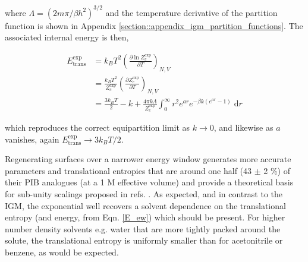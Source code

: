 \documentclass[../main.tex]{subfiles}
\begin{document}
where $\Lambda = (2m\pi/\beta h^2)^{3/2}$ and the temperature derivative of the partition function is shown in Appendix \ref{section::appendix_igm_partition_functions}. The associated internal energy is then,

\begin{equation}
\begin{aligned}
E_\text{trans}^\text{exp} &= k_BT^2 \left(\frac{\partial \ln Z_c^\text{exp}}{\partial T} \right)_{N, V}  \\
&= \frac{k_BT^2}{Z_c^\text{exp}} \left(\frac{\partial Z_c^\text{exp}}{\partial T} \right)_{N, V} \\
&=\frac{3k_BT}{2} - k + \frac{4 \pi k \Lambda}{Z_c^\text{exp}} \int_0^\infty r^2 e^{ar} e^{-\beta k (e^{ar} - 1)} \;\text{d}r
\end{aligned}
\label{E_ew}
\end{equation}

which reproduces the correct equipartition limit as $k \rightarrow 0$, and likewise as $a$ vanishes, again $E_\text{trans}^\text{exp} \rightarrow 3k_BT/2$.

Regenerating surfaces over a narrower energy window generates more accurate parameters and translational entropies that are around one half (43 $\pm$ 2 \%) of their PIB analogues (at a 1 M effective volume) and provide a theoretical basis for sub-unity scalings proposed in refs. \cite{Tanaka2011, Deubel2006, Li2016, DiTommaso2010}. As expected, and in contrast to the IGM, the exponential well recovers a solvent dependence on the  translational entropy (and energy, from Eqn. \eqref{E_ew}) which should be present. For higher number density solvents e.g. water that are more tightly packed around the solute, the translational entropy is uniformly smaller than for acetonitrile or benzene, as would be expected.
\vspace{0.2cm}
\end{document}
